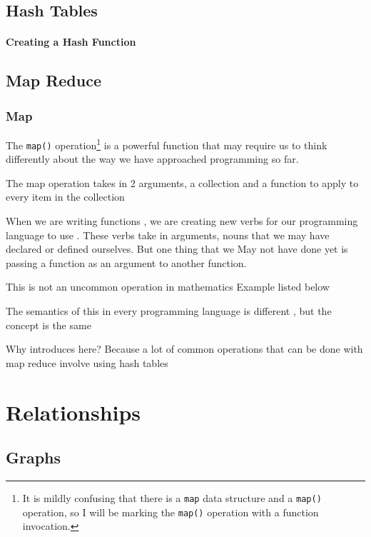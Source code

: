 \documentclass[10pt,a4paper]{book}
\begin{document}
\chapter{Hash Tables}
\subsection{Creating a Hash Function}



\chapter{Map Reduce}


\section{Map}
The \texttt{map()} operation\footnote{It is mildly confusing that there is a \texttt{map} data structure and a \texttt{map()} operation, so I will be marking the \texttt{map()} operation with a function invocation.} is a powerful function that may require us to think  differently about the way we have approached programming so far.

The map operation takes in 2 arguments, a collection and a function to apply to every item in the collection




When we are writing functions , we are creating new verbs for our programming language to use . These verbs take in arguments, nouns that we may have declared or defined ourselves. But one thing that we May not have done yet is passing a function as an argument to another function.

This is not an uncommon operation in mathematics Example listed below 



The semantics of this in every programming language is different , but the concept is the same 



Why introduces here? Because a lot of common operations that can be done with map reduce involve using hash tables 


\part{Relationships}

\chapter{Graphs}
\end{document}

